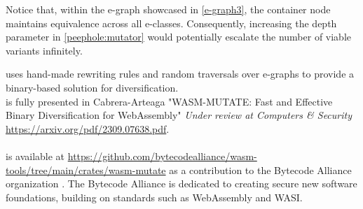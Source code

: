 Notice that, within the e-graph showcased in \autoref{e-graph3}, the container node maintains equivalence across all e-classes. 
Consequently, increasing the depth parameter in \autoref{peephole:mutator} would potentially escalate the number of viable variants infinitely.



\begin{tcolorbox}[title=Contribution paper and artifact,boxrule=1pt,arc=.2em,boxsep=1.0mm]
  \tool uses hand-made rewriting rules and random traversals over e-graphs to provide a binary-based solution for \Wasm diversification. \\
  \tool is fully presented in Cabrera-Arteaga \etal "WASM-MUTATE: Fast and Effective Binary Diversification for WebAssembly"
  \emph{Under review at Computers \& Security}
 \url{https://arxiv.org/pdf/2309.07638.pdf}.
  \\\\
  \tool is available at \url{https://github.com/bytecodealliance/wasm-tools/tree/main/crates/wasm-mutate} as a contribution to the Bytecode Alliance organization . The Bytecode Alliance is dedicated to creating secure new software foundations, building on standards such as WebAssembly and WASI.
\end{tcolorbox}